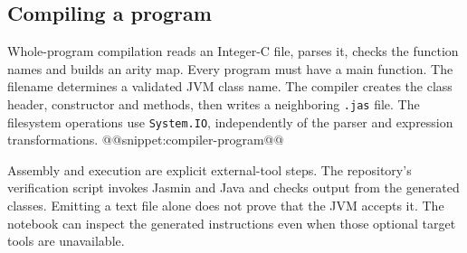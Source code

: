 \subsection{Compiling a program}
Whole-program compilation reads an Integer-C file, parses it, checks the function names and builds an arity map.
Every program must have a main function.
The filename determines a validated JVM class name.
The compiler creates the class header, constructor and methods, then writes a neighboring \texttt{.jas} file.
The filesystem operations use \texttt{System.IO}, independently of the parser and expression transformations.
@@snippet:compiler-program@@

Assembly and execution are explicit external-tool steps.
The repository's verification script invokes Jasmin and Java and checks output from the generated classes.
Emitting a text file alone does not prove that the JVM accepts it.
The notebook can inspect the generated instructions even when those optional target tools are unavailable.
